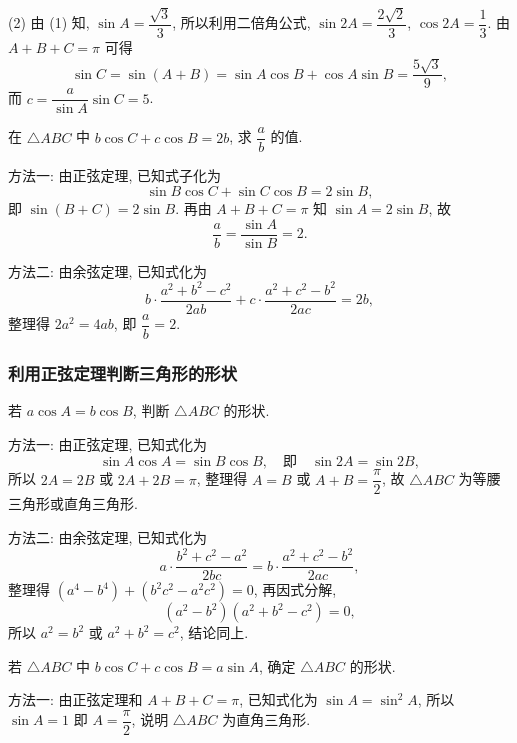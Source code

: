     (2) 由 (1) 知,  $\sin A= \dfrac{\sqrt3}{3}$, 
    所以利用二倍角公式, $\sin 2A= \dfrac{2\sqrt2}{3}$, $\cos 2A= \dfrac13$. 由 $A+B+C= \pi$ 可得 
    \[\sin C= \sin(A+B)= \sin A\cos B+ \cos A\sin B
        = \dfrac{5\sqrt3}{9},\]
    而 $c= \dfrac{a}{\sin A}\sin C= 5$.
\endsolution

\lianxi
\begin{exercise}[s]
    在 $\triangle ABC$ 中 $b\cos C+c\cos B=2b$, 求 $\dfrac{a}{b}$ 的值.
\end{exercise}
\beginsolution
    方法一: 由正弦定理, 
    已知式子化为
    \[\sin B\cos C+\sin C\cos B= 2\sin B,\]
    即 $\sin(B+C)= 2\sin B$. 再由 $A+B+C= \pi$ 知 $\sin A= 2\sin B$, 故
    \[\dfrac{a}{b}= \dfrac{\sin A}{\sin B}= 2.\]

    方法二: 由余弦定理, 已知式化为
    \[b\cdot \frac{a^2+b^2-c^2}{2ab}+ 
        c\cdot \frac{a^2+c^2-b^2}{2ac}= 2b,\]
    整理得 $2a^2=4ab$, 即 $\dfrac{a}{b}= 2$.
\endsolution

\subsubsection{利用正弦定理判断三角形的形状}
\begin{example}
    若 $a\cos A=b\cos B$, 判断 $\triangle ABC$ 的形状.
\end{example}
\beginsolution
    方法一: 由正弦定理, 已知式化为
    \[\sin A\cos A= \sin B\cos B,\quad\text{即}\quad
        \sin 2A= \sin 2B,\]
    所以 $2A=2B$ 或 $2A+2B=\pi$, 整理得 $A=B$ 或 $A+B=\dfrac\pi2$, 故 $\triangle ABC$ 为等腰三角形或直角三角形.

    方法二: 由余弦定理, 已知式化为
    \[a\cdot \frac{b^2+c^2-a^2}{2bc}
        = b\cdot \frac{a^2+c^2-b^2}{2ac},\]
    整理得 $(a^4-b^4)+ (b^2c^2-a^2c^2)= 0$, 再因式分解,
    \[(a^2-b^2)(a^2+b^2- c^2)= 0,\]
    所以 $a^2=b^2$ 或 $a^2+b^2= c^2$, 结论同上.
\endsolution

\lianxi
\begin{exercise}[s]
    若 $\triangle ABC$ 中 $b\cos C+c\cos B=a\sin A$, 确定 $\triangle ABC$ 的形状.
\end{exercise}
\beginsolution
    方法一: 由正弦定理和 $A+B+C=\pi$, 已知式化为 $\sin A= \sin^2 A$, 所以 $\sin A=1$ 即 $A=\dfrac\pi2$, 说明 $\triangle ABC$ 为直角三角形.

